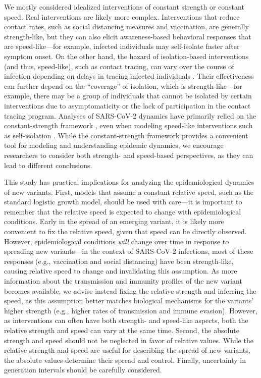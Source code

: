 \documentclass[12pt]{article}
\begin{document}
We mostly considered idealized interventions of constant strength  or constant speed. Real interventions are likely more complex.
Interventions that reduce contact rates, such as social distancing measures and vaccination, are generally strength-like, but they can also elicit awareness-based behavioral responses that are speed-like---for example, infected individuals may self-isolate faster after symptom onset.
On the other hand, the hazard of isolation-based interventions (and thus, speed-like), such as contact tracing, can vary over the course of infection depending on delays in tracing infected individuals \citep{fraser2004factors,ferretti2020quantifying,scarabel2021renewal}.
Their effectiveness can further depend on the ``coverage'' of isolation, which is strength-like---for example, there may be a group of individuals that cannot be isolated by certain interventions due to asymptomaticity or the lack of participation in the contact tracing program.
Analyses of SARS-CoV-2 dynamics have primarily relied on the constant-strength framework \citep{gostic2020practical,unwin2020state,brauner2021inferring}, even when modeling speed-like interventions such as self-isolation \citep{flaxman2020Rt,brett2020transmission}.
While the constant-strength framework provides a convenient tool for modeling and understanding epidemic dynamics, we encourage researchers to consider both strength- and speed-based perspectives, as they can lead to different conclusions.

This study has practical implications for analyzing the epidemiological dynamics of new variants.
First, models that assume a constant relative speed, such as the standard logistic growth model, should be used with care---it is important to remember that the relative speed is expected to change with epidemiological conditions.
Early in the spread of an emerging variant, it is likely more convenient to fix the relative speed, given that speed can be directly observed.
However, epidemiological conditions \textit{will} change over time in response to spreading new variants---in the context of SARS-CoV-2 infections, most of these responses (e.g., vaccination and social distancing) have been strength-like, causing relative speed to change and invalidating this assumption.
As more information about the transmission and immunity profiles of the new variant becomes available, we advise instead fixing the relative strength and inferring the speed, as this assumption better matches biological mechanisms for the variants' higher strength (e.g., higher rates of transmission and immune evasion).
However, as interventions can often have both strength- and speed-like aspects, both the relative strength and speed can vary at the same time.
Second, the absolute strength and speed should not be neglected in favor of relative values.
While the relative strength and speed are useful for describing the spread of new variants, the absolute values determine their spread and control.
Finally, uncertainty in generation intervals should be carefully considered.
\end{document}
